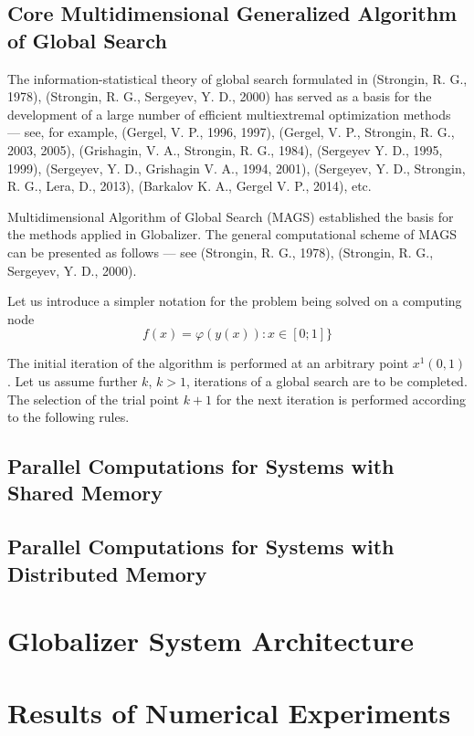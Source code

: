 \documentclass{gOMS2e}
\theoremstyle{plain}%
\theoremstyle{definition}
\theoremstyle{remark}
\begin{document}
\subsection{Core Multidimensional Generalized Algorithm of Global Search}
\label{subsec:corepar}
The information-statistical theory of global search formulated in (Strongin, R. G., 1978), (Strongin, R. G., Sergeyev, Y. D., 2000)
has served as a basis for the development of a large number of efficient multiextremal
optimization methods --- see, for example, (Gergel, V. P., 1996, 1997), (Gergel, V. P., Strongin, R. G., 2003, 2005), (Grishagin, V. A., Strongin, R. G., 1984), (Sergeyev Y. D., 1995, 1999), (Sergeyev, Y. D., Grishagin V. A., 1994, 2001), (Sergeyev, Y. D., Strongin, R. G., Lera, D., 2013), (Barkalov K. A., Gergel V. P., 2014), etc.
\par
Multidimensional Algorithm of Global Search (MAGS) established the basis for the
methods applied in Globalizer. The general computational scheme of MAGS can be
presented as follows --- see (Strongin, R. G., 1978), (Strongin, R. G., Sergeyev, Y. D., 2000).
\par
Let us introduce a simpler notation for the problem being solved on a computing node
\begin{equation}
\label{eq:oneDimTask}
f(x) = \varphi(y(x)):x\in [0;1]\}
\end{equation}
\par
The initial iteration of the algorithm is performed at an arbitrary point \(x^1(0,1)\).
Let us assume further \(k\), \(k>1\), iterations of a global search are to be completed.
The selection of the trial point \(k+1\) for the next iteration is performed according to the following rules.
\subsection{Parallel Computations for Systems with Shared Memory}
\label{subsec:sharedpar}

\subsection{Parallel Computations for Systems with Distributed Memory}
\label{subsec:distribpar}

\section{Globalizer System Architecture}
\label{sec:arch}
\section{Results of Numerical Experiments}
\label{sec:experiments}
\end{document}
